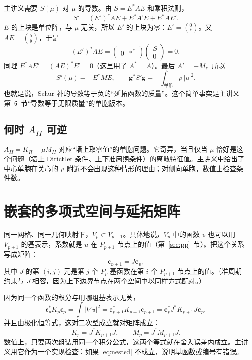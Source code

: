 \documentclass[11pt,a4paper,fontset=fandol]{ctexart}
\begin{document}
主讲义需要 $S(\mu)$ 对 $\mu$ 的导数。由 $S=E^*AE$ 和乘积法则，
\[
S'=(E')^*AE+E^*A'E+E^*AE' .
\]
$E$ 的上块是单位阵，与 $\mu$ 无关，所以 $E'$ 的上块为零：$E'=\binom{0}{\ast}$。又 $AE=\binom{S}{0}$，于是
\[
(E')^*AE=\begin{pmatrix}0&\ast^*\end{pmatrix}\begin{pmatrix}S\\0\end{pmatrix}=0 ,
\]
同理 $E^*AE'=(AE)^*E'=0$（这里用了 $A^*=A$）。最后 $A'=-M$，所以
\begin{equation}
\label{eq:schur-deriv}
S'(\mu)=-E^*ME,\qquad \bm g^*S'\bm g=-\int_{\text{单胞}}\rho\,|u|^2 .
\end{equation}
也就是说，Schur 补的导数等于负的“延拓函数的质量”。这个简单事实是主讲义第~6~节“导数等于无限质量”的单胞版本。

\subsection{\texorpdfstring{何时 $A_{II}$ 可逆}{何时内部块可逆}}

$A_{II}=K_{II}-\mu M_{II}$ 对应“墙上取零值”的单胞问题。它奇异，当且仅当 $\mu$ 恰好是这个问题（墙上 Dirichlet 条件、上下准周期条件）的离散特征值。主讲义中给出了中心单胞在关心的 $\mu$ 附近不会出现这种情形的理由；对侧向单胞，数值上检查条件数。

\section{嵌套的多项式空间与延拓矩阵}
\label{sec:nested}

同一网格、同一几何映射下，$V_p\subset V_{p+1}$。具体地说，$V_p$ 中的函数 $u$ 也可以用 $V_{p+1}$ 的基表示，系数就是 $u$ 在 $P_{p+1}$ 节点上的值（第~\ref{sec:pp}~节）。把这个关系写成矩阵：
\[
\bm c_{p+1}=J\bm c_p ,
\]
其中 $J$ 的第 $(i,j)$ 元是第 $j$ 个 $P_p$ 基函数在第 $i$ 个 $P_{p+1}$ 节点上的值。（准周期约束与 $J$ 相容，因为上下边界节点在两个空间中以同样方式配对。）

因为同一个函数的积分与用哪组基表示无关，
\[
\bm c_p^*K_p\bm c_p=\int|\nabla u|^2=\bm c_{p+1}^*K_{p+1}\bm c_{p+1}=\bm c_p^*J^*K_{p+1}J\bm c_p ,
\]
并且由极化恒等式，这对二次型成立就对矩阵成立：
\begin{equation}
\label{eq:nested}
K_p=J^*K_{p+1}J,\qquad M_p=J^*M_{p+1}J .
\end{equation}
数值上，只要两次组装用同一个积分公式，这两个等式就在舍入误差内成立。主讲义用它作为一个实现检查：如果 \eqref{eq:nested} 不成立，说明基函数或编号有错误。
\end{document}
